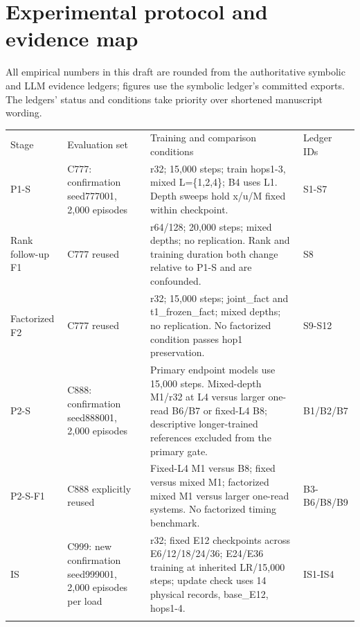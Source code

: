 \section{Experimental protocol and evidence map}\label{app:B}

All empirical numbers in this draft are rounded from the authoritative
symbolic and LLM evidence ledgers;
figures use the symbolic ledger’s committed exports. The ledgers' status and
conditions take priority over shortened manuscript wording.


{\footnotesize
\setlength{\tabcolsep}{3pt}
\begin{longtable}{W{83}{8}W{346}{8}W{487}{8}W{83}{8}}
\toprule
Stage & Evaluation set & Training and comparison conditions & Ledger IDs \\ \addlinespace[3pt]
\midrule \endhead
P1-S & C777: confirmation seed777001, 2,000 episodes & r32; 15,000 steps; train hops1-3, mixed L=\{1,2,4\}; B4 uses L1. Depth sweeps hold x/\allowbreak{}u/\allowbreak{}M fixed within checkpoint. & S1-S7 \\ \addlinespace[3pt]  %
Rank follow-up F1 & C777 reused & r64/\allowbreak{}128; 20,000 steps; mixed depths; no replication. Rank and training duration both change relative to P1-S and are confounded. & S8 \\ \addlinespace[3pt]  %
Factorized F2 & C777 reused & r32; 15,000 steps; joint\_fact and t1\_frozen\_fact; mixed depths; no replication. No factorized condition passes hop1 preservation. & S9-S12 \\ \addlinespace[3pt]  %
P2-S & C888: confirmation seed888001, 2,000 episodes & Primary endpoint models use 15,000 steps. Mixed-depth M1/\allowbreak{}r32 at L4 versus larger one-read B6/\allowbreak{}B7 or fixed-L4 B8; descriptive longer-trained references excluded from the primary gate. & B1/\allowbreak{}B2/\allowbreak{}B7 \\ \addlinespace[3pt]  %
P2-S-F1 & C888 explicitly reused & Fixed-L4 M1 versus B8; fixed versus mixed M1; factorized mixed M1 versus larger one-read systems. No factorized timing benchmark. & B3-B6/\allowbreak{}B8/\allowbreak{}B9 \\ \addlinespace[3pt]  %
IS & C999: new confirmation seed999001, 2,000 episodes per load & r32; fixed E12 checkpoints across E6/\allowbreak{}12/\allowbreak{}18/\allowbreak{}24/\allowbreak{}36; E24/\allowbreak{}E36 training at inherited LR/\allowbreak{}15,000 steps; update check uses 14 physical records, base\_E12, hops1-4. & IS1-IS4 \\ \addlinespace[3pt]  %

\end{longtable}}
